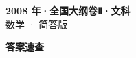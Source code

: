 \documentclass[zihao=-4, a4paper]{ctexart}
\begin{document}
\begin{center}
  {\Large\bfseries 2008 年·全国大纲卷Ⅱ·文科}\\[4pt]
  {\large 数学 · 简答版}
\end{center}
\medskip
{}

\clearpage
{}
\begin{center}{\Large\bfseries 答案速查}\end{center}
\medskip

\end{document}
